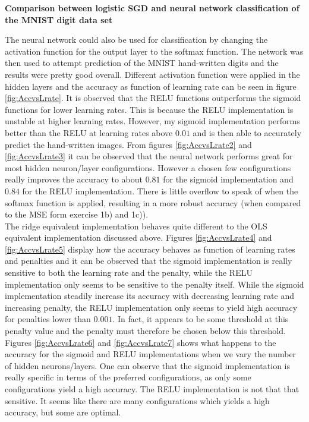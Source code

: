 \documentclass[12pt,a4paper]{article}
\begin{document}
\begin{center}
\large{\textbf{Comparison between logistic SGD and neural network classification of the MNIST digit data set}}
\end{center}

\noindent The neural network could also be used for classification by changing the activation function for the output layer to the softmax function. The network was then used to attempt prediction of the MNIST hand-written digits and the results were pretty good overall. Different activation function were applied in the hidden layers and the accuracy as function of learning rate can be seen in figure \ref{fig:AccvsLrate}. It is observed that the RELU functions outperforms the sigmoid functions for lower learning rates. This is because the RELU implementation is unstable at higher learning rates. However, my sigmoid implementation performs better than the RELU at learning rates above $0.01$ and is then able to accurately predict the hand-written images. From figures \ref{fig:AccvsLrate2} and \ref{fig:AccvsLrate3} it can be observed that the neural network performs great for most hidden neuron/layer configurations. However a chosen few configurations really improves the accuracy to about $0.81$ for the sigmoid implementation and $0.84$ for the RELU implementation. There is little overflow to speak of when the softmax function is applied, resulting in a more robust accuracy (when compared to the MSE form exercise 1b) and 1c)). 
\\
The ridge equivalent implementation behaves quite different to the OLS equivalent implementation discussed above. Figures \ref{fig:AccvsLrate4} and \ref{fig:AccvsLrate5} display how the accuracy behaves as function of learning rates and penalties and it can be observed that the sigmoid implementation is really sensitive to both the learning rate and the penalty, while the RELU implementation only seems to be sensitive to the penalty itself. While the sigmoid implementation steadily increase its accuracy with decreasing learning rate and increasing penalty, the RELU implementation only seems to yield high accuracy for penalties lower than $0.001$. In fact, it appears to be some threshold at this penalty value and the penalty must therefore be chosen below this threshold. Figures \ref{fig:AccvsLrate6} and \ref{fig:AccvsLrate7} shows what happens to the accuracy for the sigmoid and RELU implementations when we vary the number of hidden neurons/layers. One can observe that the sigmoid implementation is really specific in terms of the preferred configurations, as only some configurations yield a high accuracy. The RELU implementation is not that that sensitive. It seems like there are many configurations which yields a high accuracy, but some are optimal. 
\end{document}
